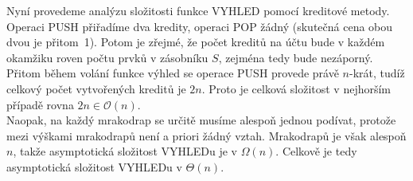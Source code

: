 \documentclass[12pt,a4paper]{article}
\theoremstyle{plain}
\begin{document}
Nyní provedeme analýzu složitosti funkce VYHLED pomocí kreditové metody. Operaci PUSH přiřadíme dva kredity, operaci POP žádný (skutečná cena obou dvou je přitom~1). Potom je zřejmé, že počet kreditů na účtu bude v každém okamžiku roven počtu prvků v zásobníku $S$, zejména tedy bude nezáporný. Přitom během volání funkce výhled se operace PUSH provede právě $n$-krát, tudíž celkový počet vytvořených kreditů je $2n$. Proto je celková složitost v nejhorším případě rovna $2n\in\mathcal{O}(n)$.\\

Naopak, na každý mrakodrap se určitě musíme alespoň jednou podívat, protože mezi výškami mrakodrapů není a priori žádný vztah. Mrakodrapů je však alespoň $n$, takže asymptotická složitost VYHLEDu je v $\Omega(n)$. Celkově je tedy asymptotická složitost VYHLEDu v $\Theta(n)$.
\end{document}

